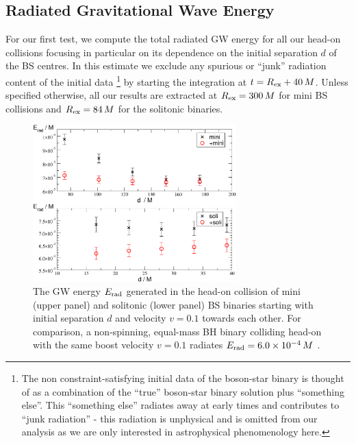 \subsection{Radiated Gravitational Wave Energy}
%
For our first test, we compute the total radiated
GW energy for all our head-on collisions focusing
in particular on its dependence on the initial separation
$d$ of the BS centres. In this estimate we exclude
any spurious or ``junk'' radiation content
of the initial data
\footnote{
The non constraint-satisfying initial data of the boson-star binary is thought of as a
combination of the \enquote{true} boson-star binary solution plus \enquote{something else}.
This \enquote{something else} radiates away at early
times and contributes to \enquote{junk radiation} - this radiation is unphysical
and is omitted from our analysis as we are only interested in astrophysical
phenomenology here.}
by starting the integration
at $t=R_{\rm ex}+40\,M$. Unless specified otherwise,
all our results are extracted at $R_{\rm ex}=300\,M$ for
mini BS collisions and $R_{\rm ex}=84\,M$ for the
solitonic binaries.
%
\begin{figure}
    \centering
    \includegraphics[width=0.7\textwidth]{malaise_source/erad.pdf}
    \caption{The GW energy $E_{\rm rad}$ generated in
    the head-on collision of mini (upper panel) and solitonic (lower panel) BS binaries starting
    with initial separation $d$ and velocity $v=0.1$ towards
    each other.
    For comparison, a non-spinning, equal-mass BH binary
    colliding head-on with the same boost velocity $v=0.1$ radiates $E_{\rm rad}=6.0\times 10^{-4}\,M$
    \cite{Sperhake:2019oaw}.
    }
    \label{mal:fig:erad}
\end{figure}
%

